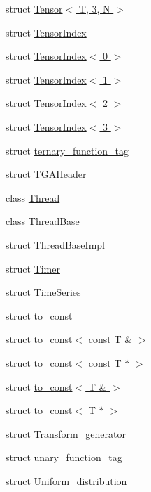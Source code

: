 \begin{DoxyCompactItemize}
struct \hyperlink{structcugar_1_1_tensor_3_01_t_00_013_00_01_n_01_4}{Tensor$<$ T, 3, N $>$}
\item 
struct \hyperlink{structcugar_1_1_tensor_index}{Tensor\+Index}
\item 
struct \hyperlink{structcugar_1_1_tensor_index_3_010_01_4}{Tensor\+Index$<$ 0 $>$}
\item 
struct \hyperlink{structcugar_1_1_tensor_index_3_011_01_4}{Tensor\+Index$<$ 1 $>$}
\item 
struct \hyperlink{structcugar_1_1_tensor_index_3_012_01_4}{Tensor\+Index$<$ 2 $>$}
\item 
struct \hyperlink{structcugar_1_1_tensor_index_3_013_01_4}{Tensor\+Index$<$ 3 $>$}
\item 
struct \hyperlink{structcugar_1_1ternary__function__tag}{ternary\+\_\+function\+\_\+tag}
\item 
struct \hyperlink{structcugar_1_1_t_g_a_header}{T\+G\+A\+Header}
\item 
class \hyperlink{classcugar_1_1_thread}{Thread}
\item 
class \hyperlink{classcugar_1_1_thread_base}{Thread\+Base}
\item 
struct \hyperlink{structcugar_1_1_thread_base_impl}{Thread\+Base\+Impl}
\item 
struct \hyperlink{structcugar_1_1_timer}{Timer}
\item 
struct \hyperlink{structcugar_1_1_time_series}{Time\+Series}
\item 
struct \hyperlink{structcugar_1_1to__const}{to\+\_\+const}
\item 
struct \hyperlink{structcugar_1_1to__const_3_01const_01_t_01_6_01_4}{to\+\_\+const$<$ const T \& $>$}
\item 
struct \hyperlink{structcugar_1_1to__const_3_01const_01_t_01_5_01_4}{to\+\_\+const$<$ const T $\ast$ $>$}
\item 
struct \hyperlink{structcugar_1_1to__const_3_01_t_01_6_01_4}{to\+\_\+const$<$ T \& $>$}
\item 
struct \hyperlink{structcugar_1_1to__const_3_01_t_01_5_01_4}{to\+\_\+const$<$ T $\ast$ $>$}
\item 
struct \hyperlink{structcugar_1_1_transform__generator}{Transform\+\_\+generator}
\item 
struct \hyperlink{structcugar_1_1unary__function__tag}{unary\+\_\+function\+\_\+tag}
\item 
struct \hyperlink{structcugar_1_1_uniform__distribution}{Uniform\+\_\+distribution}
\item 

\end{DoxyCompactItemize}
